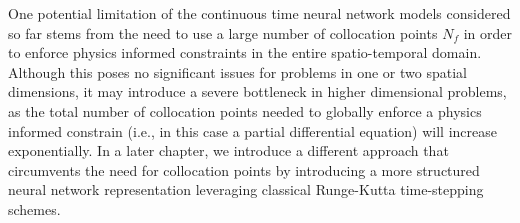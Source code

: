 \documentclass[book.tex]{subfiles}
\begin{document}


One potential limitation of the continuous time neural network models considered so far stems from the need to use a large number of collocation points $N_f$ in order to enforce physics informed constraints in the entire spatio-temporal domain. Although this poses no significant issues for problems in one or two spatial dimensions, it may introduce a severe bottleneck in higher dimensional problems, as the total number of collocation points needed to globally enforce a physics informed constrain (i.e., in this case a partial differential equation) will increase exponentially. In a later chapter, we introduce a different approach that circumvents the need for collocation points by introducing a more structured neural network representation leveraging classical Runge-Kutta time-stepping schemes.





\end{document}
